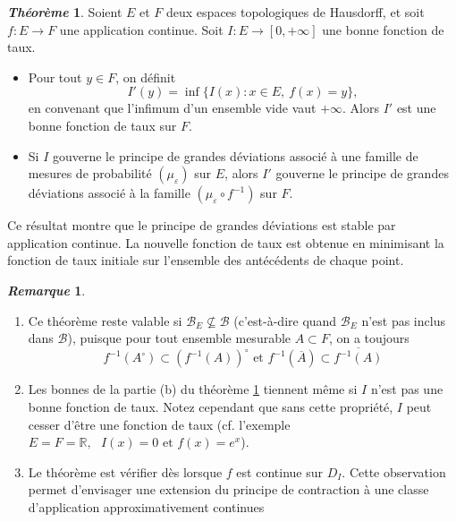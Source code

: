 \documentclass[12pt,a4paper,twoside]{book}%
\theoremstyle{definition}
\newtheorem{rem}{\textit{Remarque}}[section]
\newtheorem{thm}[dfn]{\textit{Théorème}}
\numberwithin{equation}{section}
\begin{document}
\begin{thm}\label{thm:contraction}
	Soient $E$ et $F$ deux espaces topologiques de Hausdorff, et soit
	$f:E\longrightarrow F$ une application continue.
	Soit $I:E\longrightarrow [0,+\infty]$ une bonne fonction de taux.
	\begin{itemize}
		\item[(a)] Pour tout $y\in F$, on définit
		\[
		I'(y)=\inf\{I(x): x\in E,\ f(x)=y\},
		\]
		en convenant que l'infimum d'un ensemble vide vaut $+\infty$.
		Alors $I'$ est une bonne fonction de taux sur $F$.
		
		\item[(b)] Si $I$ gouverne le principe de grandes déviations associé à une famille de mesures de probabilité $(\mu_\varepsilon)$ sur $E$, alors $I'$ gouverne le principe de grandes déviations associé à la famille $(\mu_\varepsilon\circ f^{-1})$ sur $F$.
	\end{itemize}
\end{thm}
Ce résultat montre que le principe de grandes déviations est stable par application continue. La nouvelle fonction de taux est obtenue en minimisant la fonction de taux initiale sur l’ensemble des antécédents de chaque point.
\begin{rem}
 	\begin{enumerate}
 		\item Ce théorème reste valable si $\mathcal{B}_E\nsubseteq \mathcal{B}$ (c'est-à-dire quand $\mathcal{B}_E$ n'est pas inclus dans $\mathcal{B}$), puisque pour tout ensemble mesurable $A\subset F$, on a toujours
 		\[
 		f^{-1}(A^\circ) \subset (f^{-1}(A))^\circ \text{ et } f^{-1}(\overline{A}) \subset \overline{f^{-1}(A)}
 		\]
 		\item Les bonnes de la partie (b) du théorème \ref{thm:contraction} tiennent même si $I$ n'est pas une bonne fonction de taux. Notez cependant que sans cette propriété, $I$ peut cesser d'être une fonction de taux (cf. l'exemple $E=F=\mathbb{R},\text{ } I(x)=0\text{ et } f(x)=e^x$).
 		\item Le théorème est vérifier dès lorsque $f$ est continue sur $D_I$. Cette observation permet d'envisager une extension du principe de contraction à une classe d'application approximativement continues
 	\end{enumerate}
\end{rem}
\end{document}
